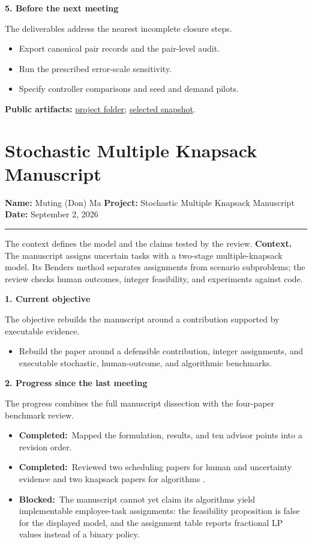 \documentclass[10pt]{article}
\newcommand{\statusdone}{\textcolor{definitiongreen}{\textbf{Completed:}}\ }
\newcommand{\statusblocked}{\textcolor{accent}{\textbf{Blocked:}}\ }
\newcommand{\updatehead}[2]{%
  \vspace{0.22em}\noindent\textbf{\textcolor{uablue}{#1. #2}}\par\vspace{0.04em}}
\newcommand{\projectline}[1]{%
  {\small\noindent\textbf{Name:} Muting (Don) Ma\hfill
    \textbf{Project:} #1\hfill
    \textbf{Date:} September 2, 2026\par}
  \vspace{0.18em}\hrule\vspace{0.42em}}
\newenvironment{tightitems}{%
  \begin{itemize}[leftmargin=1.15em,label=\textcolor{uablue}{\scriptsize$\bullet$},
    topsep=0.04em,itemsep=0.08em,parsep=0pt,partopsep=0pt]}{\end{itemize}}
\newcommand{\artifact}[2]{\href{#1}{#2}}
\begin{document}
\updatehead{5}{Before the next meeting}
\sumpara The deliverables address the nearest incomplete closure steps. \sumparaend
\begin{tightitems}
  \item \fin Export canonical pair records and the pair-level audit. \fine
  \item \fin Run the prescribed error-scale sensitivity. \fine
  \item \fin Specify controller comparisons and seed and demand pilots. \fine
\end{tightitems}

\vspace{0.05em}
{\footnotesize\textbf{Public artifacts:}
\artifact{https://github.com/mutingma123/OpenProjects/tree/main/BiObjectiveRevisionC1}{project folder};
\artifact{https://github.com/mutingma123/OpenProjects/tree/main/BiObjectiveRevisionC1/Figures}{selected snapshot}.\par}

\clearpage
\section{Stochastic Multiple Knapsack Manuscript}
\label{sec:knapsack}
\projectline{Stochastic Multiple Knapsack Manuscript}

\sumpara The context defines the model and the claims tested by the review. \sumparaend
\noindent\textbf{Context.}
\fin The manuscript assigns uncertain tasks with a two-stage multiple-knapsack model. \fine
\fin Its Benders method separates assignments from scenario subproblems; the review checks human outcomes, integer feasibility, and experiments against code. \fine

\updatehead{1}{Current objective}
\sumpara The objective rebuilds the manuscript around a contribution supported by executable evidence. \sumparaend
\begin{tightitems}
  \item \fin Rebuild the paper around a defensible contribution, integer assignments, and executable stochastic, human-outcome, and algorithmic benchmarks. \fine
\end{tightitems}

\updatehead{2}{Progress since the last meeting}
\sumpara The progress combines the full manuscript dissection with the four-paper benchmark review. \sumparaend
\begin{tightitems}
  \item \fin \statusdone Mapped the formulation, results, and ten advisor points into a revision order. \fine
  \item \fin \statusdone Reviewed two scheduling papers for human and uncertainty evidence and two knapsack papers for algorithms \cite{gulmez2026,perreault2025,mancini2024,masmoudi2024}. \fine
  \item \fin \statusblocked The manuscript cannot yet claim its algorithms yield implementable employee-task assignments: the feasibility proposition is false for the displayed model, and the assignment table reports fractional LP values instead of a binary policy. \fine
\end{tightitems}
\end{document}
